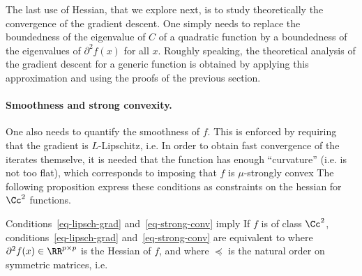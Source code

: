 The last use of Hessian, that we explore next, is to study theoretically the convergence of the gradient descent. One simply needs to replace the boundedness of the eigenvalue of $C$ of a quadratic function by a boundedness of the eigenvalues of $\partial^2 f(x)$ for all $x$.
%
Roughly speaking, the theoretical analysis of the gradient descent for a generic function is obtained by applying this approximation and using the proofs of the previous section.


\paragraph{Smoothness and strong convexity.}

One also needs to quantify the smoothness of $f$. This is enforced by requiring that the gradient is $L$-Lipschitz, i.e.
In order to obtain fast convergence of the iterates themselve, it is needed that the function has enough ``curvature'' (i.e. is not too flat), which corresponds to imposing that $f$ is $\mu$-strongly convex
The following proposition express these conditions as constraints on the hessian for $\Cc^2$ functions.

\begin{prop}\label{prop-smooth-strong}
Conditions~\eqref{eq-lipsch-grad} and~\eqref{eq-strong-conv} imply
If $f$ is of class $\Cc^2$, conditions~\eqref{eq-lipsch-grad} and~\eqref{eq-strong-conv} are equivalent to
where $\partial^2 f(x) \in \RR^{p \times p}$ is the Hessian of $f$, and 
where $\preceq$ is the natural order on symmetric matrices, i.e.
\end{prop}

